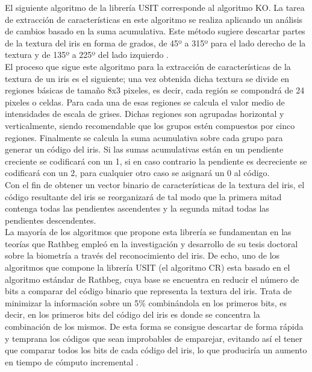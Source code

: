 El siguiente algoritmo de la librería USIT corresponde al algoritmo KO. La tarea de extracción de características en este algoritmo se realiza aplicando un análisis de cambios basado en la suma acumulativa. Este método sugiere descartar partes de la textura del iris en forma de grados, de 45º a 315º para el lado derecho de la textura y de 135º a 225º del lado izquierdo \cite{Reference18} \cite{Reference19}. \\

El proceso que sigue este algoritmo para la extracción de características de la textura de un iris es el siguiente; una vez obtenida dicha textura se divide en regiones básicas de tamaño 8x3 pixeles, es decir, cada región se compondrá de 24 pixeles o celdas. Para cada una de esas regiones se calcula el valor medio de intensidades de escala de grises. Dichas regiones son agrupadas horizontal y verticalmente, siendo recomendable que los grupos estén compuestos por cinco regiones. Finalmente se calcula la suma acumulativa sobre cada grupo para generar un código del iris. Si las sumas acumulativas están en un pendiente creciente se codificará con un 1, si en caso contrario la pendiente es decreciente se codificará con un 2, para cualquier otro caso se asignará un 0 al código. \\

Con el fin de obtener un vector binario de características de la textura del iris, el código resultante del iris se reorganizará de tal modo que la primera mitad contenga todas las pendientes ascendentes y la segunda mitad todas las pendientes descendentes. \\

La mayoría de los algoritmos que propone esta librería se fundamentan en las teorías que Rathbeg empleó en la investigación y desarrollo de su tesis doctoral sobre la biometría a través del reconocimiento del iris. De echo, uno de los algoritmos que compone la librería USIT (el algoritmo CR) esta basado en el algoritmo estándar de Rathbeg, cuya base se encuentra en reducir el número de bits a comparar del código binario que representa la textura del iris. Trata de minimizar la información sobre un 5\% combinándola en los primeros bits, es decir, en los primeros bits del código del iris es donde se concentra la combinación de los mismos. De esta forma se consigue descartar de forma rápida y temprana los códigos que sean improbables de emparejar, evitando así el tener que comparar todos los bits de cada código del iris, lo que produciría un aumento en tiempo de cómputo incremental \cite{Reference18} \cite{Reference19}.\\

